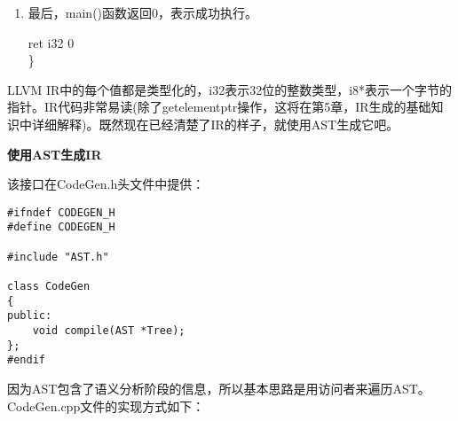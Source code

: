 \begin{enumerate}
\item 最后，main()函数返回0，表示成功执行。
\begin{tcolorbox}[colback=white,colframe=black]
	\hspace*{1cm}ret i32 0 \\
\}
\end{tcolorbox}

\end{enumerate}

LLVM IR中的每个值都是类型化的，i32表示32位的整数类型，i8*表示一个字节的指针。IR代码非常易读(除了getelementptr操作，这将在第5章，IR生成的基础知识中详细解释)。既然现在已经清楚了IR的样子，就使用AST生成它吧。\par

\hspace*{\fill} \par %
\textbf{使用AST生成IR}

该接口在CodeGen.h头文件中提供：

\begin{lstlisting}[caption={}]
#ifndef CODEGEN_H
#define CODEGEN_H

#include "AST.h"

class CodeGen
{
public:
	void compile(AST *Tree);
};
#endif
\end{lstlisting}

因为AST包含了语义分析阶段的信息，所以基本思路是用访问者来遍历AST。CodeGen.cpp文件的实现方式如下：

